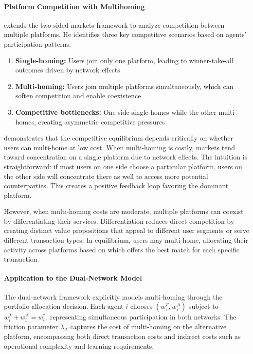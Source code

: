 \paragraph{Platform Competition with Multihoming}

 extends the two-sided markets framework to analyze competition between multiple platforms. He identifies three key competitive scenarios based on agents' participation patterns:

\begin{enumerate}
    \item \textbf{Single-homing:} Users join only one platform, leading to winner-take-all outcomes driven by network effects
    \item \textbf{Multi-homing:} Users join multiple platforms simultaneously, which can soften competition and enable coexistence
    \item \textbf{Competitive bottlenecks:} One side single-homes while the other multi-homes, creating asymmetric competitive pressures
\end{enumerate}

 demonstrates that the competitive equilibrium depends critically on whether users can multi-home at low cost. When multi-homing is costly, markets tend toward concentration on a single platform due to network effects. The intuition is straightforward: if most users on one side choose a particular platform, users on the other side will concentrate there as well to access more potential counterparties. This creates a positive feedback loop favoring the dominant platform.

However, when multi-homing costs are moderate, multiple platforms can coexist by differentiating their services. Differentiation reduces direct competition by creating distinct value propositions that appeal to different user segments or serve different transaction types. In equilibrium, users may multi-home, allocating their activity across platforms based on which offers the best match for each specific transaction.

\paragraph{Application to the Dual-Network Model}

The dual-network framework explicitly models multi-homing through the portfolio allocation decision. Each agent $i$ chooses $(w_i^T, w_i^A)$ subject to $w_i^T + w_i^A = w_i^*$, representing simultaneous participation in both networks. The friction parameter $\lambda_A$ captures the cost of multi-homing on the alternative platform, encompassing both direct transaction costs and indirect costs such as operational complexity and learning requirements.

